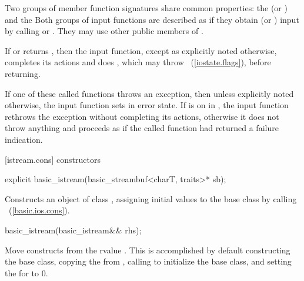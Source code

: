 \pnum
Two groups of member function signatures share common properties:
the
(or
)
and the
Both groups of input functions are described as if they obtain (or
)
input
by calling
or
.
They may use other public members of
.

\pnum
If
or
returns
,
then the input function, except as explicitly noted otherwise, completes its actions and does
,
which may throw
~(\ref{iostate.flags}), before returning.

\pnum
If one of these called functions throws an exception, then unless explicitly noted otherwise,
the input function sets
in error state.
If
is on in
,
the input function
rethrows the exception without completing its actions, otherwise
it does not throw anything and proceeds as if the called function had returned
a failure indication.

[istream.cons]{ constructors}

%
\begin{itemdecl}
explicit basic_istream(basic_streambuf<charT, traits>* sb);
\end{itemdecl}

%
\begin{itemdescr}
\pnum
\effects
Constructs an object of class
,
assigning initial values to the base class by calling
~(\ref{basic.ios.cons}).

\pnum
\postcondition
{}
\end{itemdescr}


%
\begin{itemdecl}
basic_istream(basic_istream&& rhs);
\end{itemdecl}

\begin{itemdescr}
\pnum
\effects Move constructs from the rvalue .
This is accomplished by default constructing the base class, copying the
 from , calling
 to initialize the base
class, and setting the  for  to 0.
\end{itemdescr}

